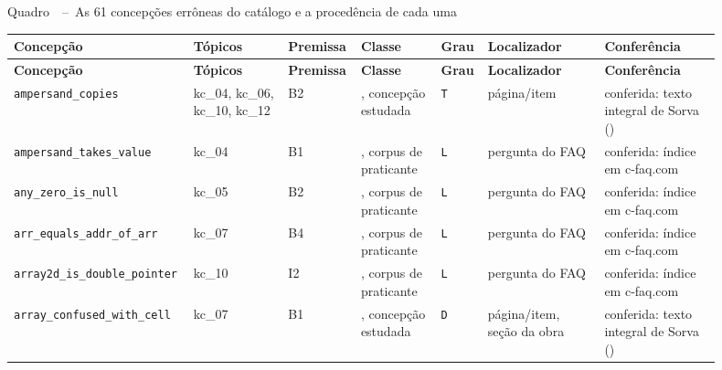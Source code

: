 \begin{center}
\label{qua:B-1}
Quadro~\thequadro~--~As 61 concepções errôneas do catálogo e a procedência de cada uma
\end{center}
{\scriptsize\setlength{\tabcolsep}{3pt}
\begin{longtable}{|>{\raggedright\arraybackslash}p{0.166\linewidth}|>{\raggedright\arraybackslash}p{0.135\linewidth}|>{\raggedright\arraybackslash}p{0.093\linewidth}|>{\raggedright\arraybackslash}p{0.119\linewidth}|>{\raggedright\arraybackslash}p{0.052\linewidth}|>{\raggedright\arraybackslash}p{0.166\linewidth}|>{\raggedright\arraybackslash}p{0.166\linewidth}|}
\hline
\textbf{Concepção} & \textbf{Tópicos} & \textbf{Premissa} & \textbf{Classe} & \textbf{Grau} & \textbf{Localizador} & \textbf{Conferência} \\ \hline
\endfirsthead
\hline
\textbf{Concepção} & \textbf{Tópicos} & \textbf{Premissa} & \textbf{Classe} & \textbf{Grau} & \textbf{Localizador} & \textbf{Conferência} \\ \hline
\endhead
\texttt{ampersand\_\allowbreak{}copies} & kc\_04, kc\_06, kc\_10, kc\_12 & B2 & 1, concepção estudada & \texttt{T} & página/item & conferida: texto integral de Sorva (\citeyear{sorva2012}) \\ \hline
\texttt{ampersand\_\allowbreak{}takes\_\allowbreak{}value} & kc\_04 & B1 & 2, corpus de praticante & \texttt{L} & pergunta do FAQ & conferida: índice em c-faq.com \\ \hline
\texttt{any\_\allowbreak{}zero\_\allowbreak{}is\_\allowbreak{}null} & kc\_05 & B2 & 2, corpus de praticante & \texttt{L} & pergunta do FAQ & conferida: índice em c-faq.com \\ \hline
\texttt{arr\_\allowbreak{}equals\_\allowbreak{}addr\_\allowbreak{}of\_\allowbreak{}arr} & kc\_07 & B4 & 2, corpus de praticante & \texttt{L} & pergunta do FAQ & conferida: índice em c-faq.com \\ \hline
\texttt{array2d\_\allowbreak{}is\_\allowbreak{}double\_\allowbreak{}pointer} & kc\_10 & I2 & 2, corpus de praticante & \texttt{L} & pergunta do FAQ & conferida: índice em c-faq.com \\ \hline
\texttt{array\_\allowbreak{}confused\_\allowbreak{}with\_\allowbreak{}cell} & kc\_07 & B1 & 1, concepção estudada & \texttt{D} & página/item, seção da obra & conferida: texto integral de Sorva (\citeyear{sorva2012}) \\ \hline

\end{longtable}}
